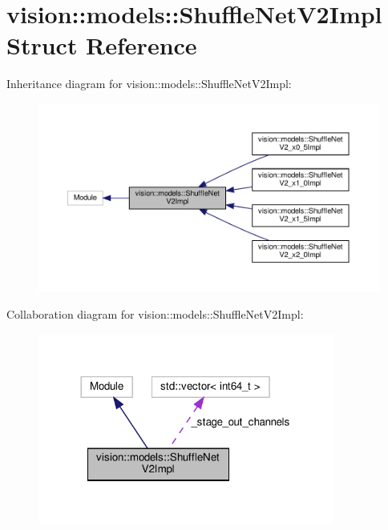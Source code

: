 \hypertarget{structvision_1_1models_1_1ShuffleNetV2Impl}{}\section{vision\+:\+:models\+:\+:Shuffle\+Net\+V2\+Impl Struct Reference}
\label{structvision_1_1models_1_1ShuffleNetV2Impl}


Inheritance diagram for vision\+:\+:models\+:\+:Shuffle\+Net\+V2\+Impl\+:
\nopagebreak
\begin{figure}[H]
\begin{center}
\leavevmode
\includegraphics[width=350pt]{structvision_1_1models_1_1ShuffleNetV2Impl__inherit__graph}
\end{center}
\end{figure}


Collaboration diagram for vision\+:\+:models\+:\+:Shuffle\+Net\+V2\+Impl\+:
\nopagebreak
\begin{figure}[H]
\begin{center}
\leavevmode
\includegraphics[width=276pt]{structvision_1_1models_1_1ShuffleNetV2Impl__coll__graph}
\end{center}
\end{figure}
